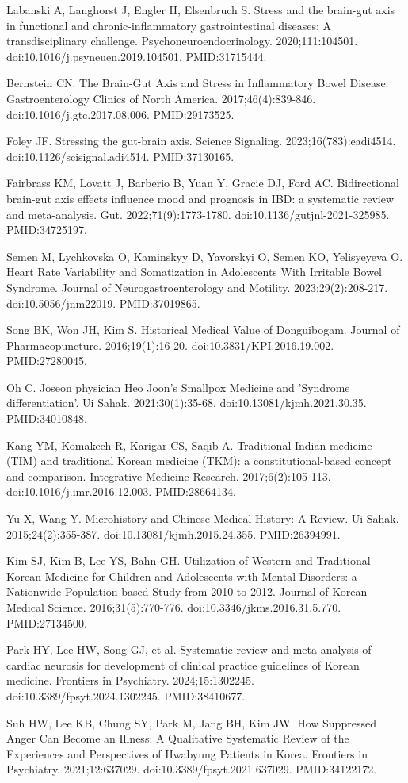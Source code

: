 \documentclass[11pt,oneside]{book}
\newcommand{\reff}[2]{\par\hangindent=7mm\hangafter=1\noindent[#1]\hspace{2mm}#2\par}
\begin{document}
\reff{10}{Labanski A, Langhorst J, Engler H, Elsenbruch S. Stress and the brain-gut axis in functional and chronic-inflammatory gastrointestinal diseases: A transdisciplinary challenge. Psychoneuroendocrinology. 2020;111:104501. doi:10.1016/j.psyneuen.2019.104501. PMID:31715444.}
\reff{11}{Bernstein CN. The Brain-Gut Axis and Stress in Inflammatory Bowel Disease. Gastroenterology Clinics of North America. 2017;46(4):839-846. doi:10.1016/j.gtc.2017.08.006. PMID:29173525.}
\reff{12}{Foley JF. Stressing the gut-brain axis. Science Signaling. 2023;16(783):eadi4514. doi:10.1126/scisignal.adi4514. PMID:37130165.}
\reff{13}{Fairbrass KM, Lovatt J, Barberio B, Yuan Y, Gracie DJ, Ford AC. Bidirectional brain-gut axis effects influence mood and prognosis in IBD: a systematic review and meta-analysis. Gut. 2022;71(9):1773-1780. doi:10.1136/gutjnl-2021-325985. PMID:34725197.}
\reff{14}{Semen M, Lychkovska O, Kaminskyy D, Yavorskyi O, Semen KO, Yelisyeyeva O. Heart Rate Variability and Somatization in Adolescents With Irritable Bowel Syndrome. Journal of Neurogastroenterology and Motility. 2023;29(2):208-217. doi:10.5056/jnm22019. PMID:37019865.}
\reff{15}{Song BK, Won JH, Kim S. Historical Medical Value of Donguibogam. Journal of Pharmacopuncture. 2016;19(1):16-20. doi:10.3831/KPI.2016.19.002. PMID:27280045.}
\reff{16}{Oh C. Joseon physician Heo Joon's Smallpox Medicine and 'Syndrome differentiation'. Ui Sahak. 2021;30(1):35-68. doi:10.13081/kjmh.2021.30.35. PMID:34010848.}
\reff{17}{Kang YM, Komakech R, Karigar CS, Saqib A. Traditional Indian medicine (TIM) and traditional Korean medicine (TKM): a constitutional-based concept and comparison. Integrative Medicine Research. 2017;6(2):105-113. doi:10.1016/j.imr.2016.12.003. PMID:28664134.}
\reff{18}{Yu X, Wang Y. Microhistory and Chinese Medical History: A Review. Ui Sahak. 2015;24(2):355-387. doi:10.13081/kjmh.2015.24.355. PMID:26394991.}
\reff{19}{Kim SJ, Kim B, Lee YS, Bahn GH. Utilization of Western and Traditional Korean Medicine for Children and Adolescents with Mental Disorders: a Nationwide Population-based Study from 2010 to 2012. Journal of Korean Medical Science. 2016;31(5):770-776. doi:10.3346/jkms.2016.31.5.770. PMID:27134500.}
\reff{20}{Park HY, Lee HW, Song GJ, et al. Systematic review and meta-analysis of cardiac neurosis for development of clinical practice guidelines of Korean medicine. Frontiers in Psychiatry. 2024;15:1302245. doi:10.3389/fpsyt.2024.1302245. PMID:38410677.}
\reff{21}{Suh HW, Lee KB, Chung SY, Park M, Jang BH, Kim JW. How Suppressed Anger Can Become an Illness: A Qualitative Systematic Review of the Experiences and Perspectives of Hwabyung Patients in Korea. Frontiers in Psychiatry. 2021;12:637029. doi:10.3389/fpsyt.2021.637029. PMID:34122172.}
\end{document}
